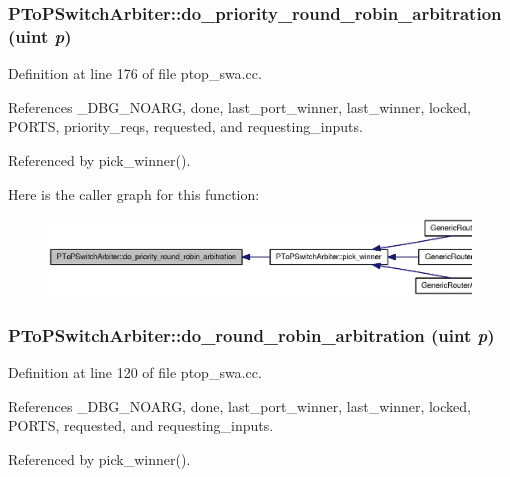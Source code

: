 \subsubsection[{do\_\-priority\_\-round\_\-robin\_\-arbitration}]{ PToPSwitchArbiter::do\_\-priority\_\-round\_\-robin\_\-arbitration ({\bf uint} {\em p})}\label{classPToPSwitchArbiter_012ef93786c879ce0c3db3891d43a9be}




Definition at line 176 of file ptop\_\-swa.cc.

References \_\-DBG\_\-NOARG, done, last\_\-port\_\-winner, last\_\-winner, locked, PORTS, priority\_\-reqs, requested, and requesting\_\-inputs.

Referenced by pick\_\-winner().

Here is the caller graph for this function:\nopagebreak
\begin{figure}[H]
\begin{center}
\leavevmode
\includegraphics[width=420pt]{classPToPSwitchArbiter_012ef93786c879ce0c3db3891d43a9be_icgraph}
\end{center}
\end{figure}
\subsubsection[{do\_\-round\_\-robin\_\-arbitration}]{ PToPSwitchArbiter::do\_\-round\_\-robin\_\-arbitration ({\bf uint} {\em p})}\label{classPToPSwitchArbiter_bb10205ca5104e0be5519bd336fb85e1}




Definition at line 120 of file ptop\_\-swa.cc.

References \_\-DBG\_\-NOARG, done, last\_\-port\_\-winner, last\_\-winner, locked, PORTS, requested, and requesting\_\-inputs.

Referenced by pick\_\-winner().

